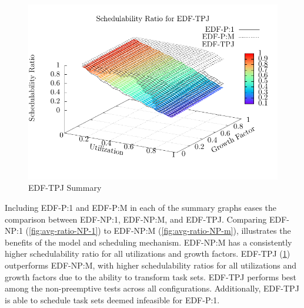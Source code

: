 \begin{figure}
  \includegraphics[width=\linewidth]{plot/avg-alg-sched/avg-ratio-TPJ-i}
  \caption{EDF-TPJ Summary}
  \label{fig:avg-ratio-TPJ-i}
\end{figure}

Including EDF-P:1 and EDF-P:M in each of the summary
graphs eases the comparison between EDF-NP:1, EDF-NP:M, and
EDF-TPJ. Comparing EDF-NP:1 (\ref{fig:avg-ratio-NP-1}) to EDF-NP:M
(\ref{fig:avg-ratio-NP-m}), illustrates the benefits of the model and
scheduling mechanism. EDF-NP:M has a consistently higher
schedulability ratio for all utilizations and growth factors. EDF-TPJ
(\ref{fig:avg-ratio-TPJ-i}) outperforms EDF-NP:M, with higher schedulability
ratios for all utilizations and growth factors due to the ability to
transform task sets. EDF-TPJ performs best among the non-preemptive
tests across all configurations. Additionally, EDF-TPJ is able to
schedule task sets deemed infeasible for EDF-P:1.

